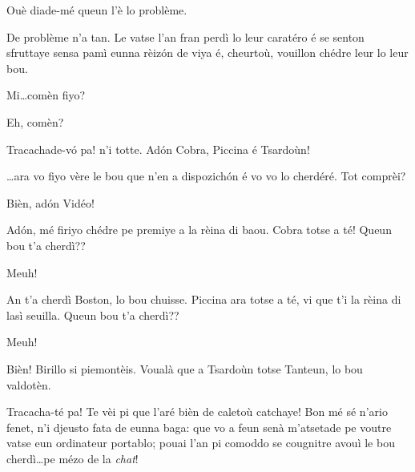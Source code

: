 \begin{drama}

\Cienspeaks {} Ouè diade-mé queun l’è lo problème.

\Schulzspeaks De problème n’a tan. Le vatse l’an fran perdì lo leur caratéro é se senton sfruttaye sensa pamì eunna rèiz\'on de viya é, cheurtoù, vouillon chédre leur lo leur bou.

\Cienspeaks Mi\ldots comèn fiyo?

\Mariettospeaks{} Eh, comèn?

\Schulzspeaks Tracachade-v\'o pa! n’i totte. Ad\'on   Cobra, Piccina é Tsardoùn!


\Schulzspeaks\ldots ara vo fiyo vère le bou que n’en a dispozich\'on é vo vo lo cherdéré. Tot comprèi?


\Schulzspeaks Bièn, ad\'on Vidéo!



\Schulzspeaks Ad\'on, mé firiyo chédre pe premiye a la rèina di baou. Cobra totse a té! Queun bou t'a cherdì??

\Cobraspeaks{} Meuh!

\Schulzspeaks An t’a cherdì Boston, lo bou chuisse. Piccina ara totse a té, vi que t’i la rèina di lasì seuilla. Queun bou t'a cherdì??

\Piccinaspeaks{} Meuh!

\Schulzspeaks Bièn! Birillo si piemontèis. Voualà que a Tsardoùn totse Tanteun, lo bou valdotèn.


\Schulzspeaks{} Tracacha-té pa! Te vèi pi que l'aré bièn de caletoù catchaye!  Bon mé sé n'ario fenet, n'i djeusto fata de eunna baga: que vo a feun senà m'atsetade pe voutre vatse eun ordinateur portablo; pouai l'an pi comoddo se cougnitre avouì le bou cherdì\ldots pe mézo de la \textit{chat}!


\end{drama}
